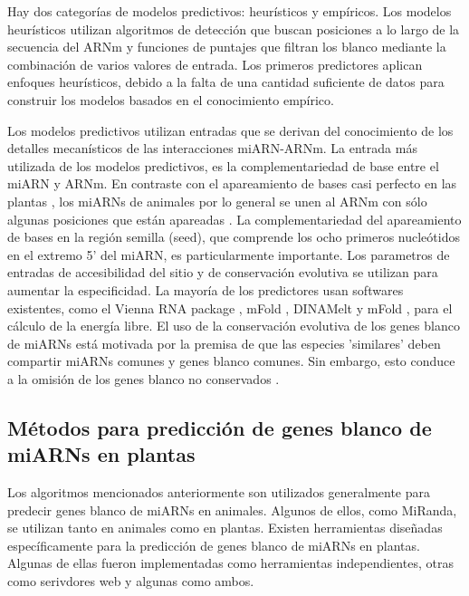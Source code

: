 Hay dos categorías de modelos predictivos: heurísticos y empíricos.
Los modelos heurísticos utilizan algoritmos de detección que buscan posiciones a lo largo de la secuencia del ARNm y funciones de puntajes que filtran los blanco mediante la combinación de varios valores de entrada.
Los primeros predictores aplican enfoques heurísticos, debido a la falta de una cantidad suficiente de datos para construir los modelos basados en el conocimiento empírico.

Los modelos predictivos utilizan entradas que se derivan del conocimiento de los detalles mecanísticos de las interacciones miARN-ARNm.
La entrada  más utilizada de los modelos predictivos, es la complementariedad de base entre el miARN y ARNm.
En contraste con el apareamiento de bases casi perfecto en las plantas \citep{Rhoades2002513}, los miARNs de animales por lo general se unen al ARNm con sólo algunas posiciones que están apareadas \citep{pmid15345038}.
La complementariedad del apareamiento de bases en la región semilla (seed), que comprende los ocho primeros nucleótidos en el extremo 5' del miARN, es particularmente importante.
Los parametros de entradas de accesibilidad del sitio y de conservación evolutiva se utilizan para aumentar la especificidad.
La mayoría de los predictores usan softwares existentes, como el Vienna RNA package \citep{pmid12824340}, mFold \citep{pmid12824337}, DINAMelt \citep{pmid15980540} y mFold \citep{pmid15215366}, para el cálculo de la energía libre.
El uso de la conservación evolutiva de los genes blanco de miARNs está motivada por la premisa de que las especies 'similares' deben compartir miARNs comunes y genes blanco comunes.
Sin embargo, esto conduce a la omisión de los genes blanco no conservados \citep{pmid17254305, pmid21674004}.


\subsection{Métodos para predicción de genes blanco de miARNs en plantas}
Los algoritmos mencionados anteriormente son utilizados generalmente para predecir genes blanco de miARNs en animales.
Algunos de ellos, como MiRanda, se utilizan tanto en animales como en plantas.
Existen herramientas diseñadas específicamente para la predicción de genes blanco de miARNs en plantas.
Algunas de ellas fueron implementadas como herramientas independientes, otras como serivdores web y algunas como ambos.


